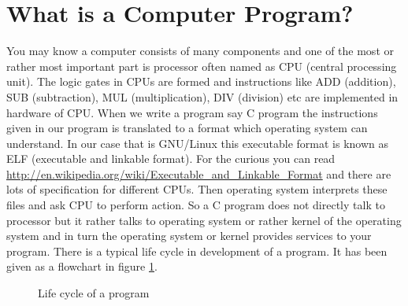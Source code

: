 \section{What is a Computer Program?}
You may know a computer consists of many components and one of the
most or rather most important part is processor often named as CPU (central
processing unit). The logic gates in CPUs are formed and instructions like ADD
(addition), SUB (subtraction), MUL (multiplication), DIV (division) etc are
implemented in hardware of CPU. When we write a program say C program the
instructions given in our program is translated to a format which operating
system can understand. In our case that is GNU/Linux this executable format is
known as ELF (executable and linkable format). For the curious you can read
\url{http://en.wikipedia.org/wiki/Executable_and_Linkable_Format} and there are
lots of specification for different CPUs. Then operating system interprets these
files and ask CPU to perform action. So a C program does not directly talk to
processor but it rather talks to operating system or rather kernel of the
operating system and in turn the operating system or kernel provides services
to your program. There is a typical life cycle in development of a program. It
has been given as a flowchart in figure \ref{fig:lifecycle}.

\begin{figure}[H]
\begin{center}
\end{center}
\caption{Life cycle of a program}
\label{fig:lifecycle}
\end{figure}

